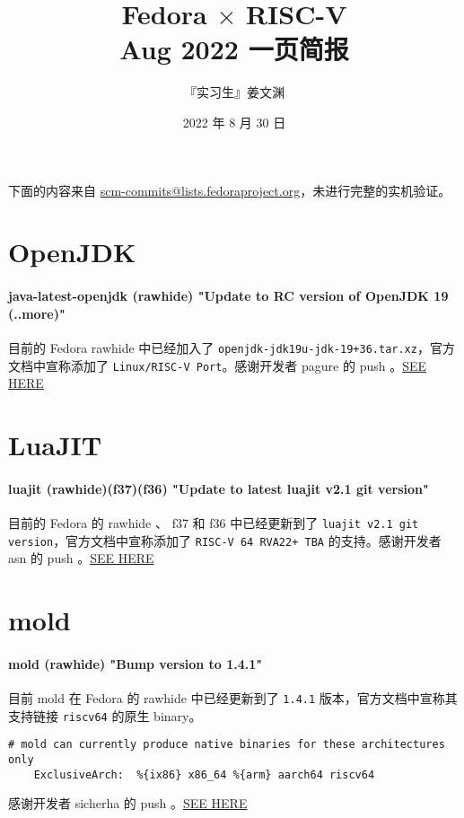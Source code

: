 \documentclass[cn,black,12pt,normal]{elegantnote}
\title{Fedora $\times$ RISC-V \\Aug 2022 一页简报}
\author{『实习生』姜文渊}
\institute{BJ-67 Tarsier-PLCT}
\date{2022 年 8 月 30 日}
\newcommand{\setParDef}{\setlength {\parskip} {0pt} }
\begin{document}
\maketitle

下面的内容来自 \url{scm-commits@lists.fedoraproject.org}，未进行完整的实机验证。

\section*{OpenJDK}

\paragraph*{java-latest-openjdk (rawhide) "Update to RC version of OpenJDK 19 (..more)"} 目前的 Fedora rawhide 中已经加入了 \lstinline{openjdk-jdk19u-jdk-19+36.tar.xz}，官方文档中宣称添加了 \lstinline{Linux/RISC-V Port}。感谢开发者 pagure 的 push 。\href{https://lists.fedoraproject.org/archives/list/scm-commits@lists.fedoraproject.org/message/UJ2DXOCMFG6H6WKK3MCKQYH66PCLMOKJ/}{SEE HERE}

\section*{LuaJIT}

\paragraph*{luajit (rawhide)(f37)(f36) "Update to latest luajit v2.1 git version"} 目前的 Fedora 的 rawhide 、 f37 和 f36 中已经更新到了 \lstinline{luajit v2.1 git version}，官方文档中宣称添加了 \lstinline{RISC-V 64 RVA22+ TBA} 的支持。感谢开发者 asn 的 push 。\href{https://lists.fedoraproject.org/archives/list/scm-commits@lists.fedoraproject.org/message/T4ABSC6XFUC2CXRGISJPM7GI7NQIMSVK/}{SEE HERE}

\section*{mold}

\paragraph*{mold (rawhide) "Bump version to 1.4.1"} 目前 mold 在 Fedora 的 rawhide 中已经更新到了 \lstinline{1.4.1} 版本，官方文档中宣称其支持链接 \lstinline{riscv64} 的原生 binary。
\begin{lstlisting}[commentstyle=\color{black}]
    # mold can currently produce native binaries for these architectures only
    ExclusiveArch:	%{ix86} x86_64 %{arm} aarch64 riscv64
\end{lstlisting}
感谢开发者 sicherha 的 push 。\href{https://lists.fedoraproject.org/archives/list/scm-commits@lists.fedoraproject.org/message/WDUJUOX3XOMIVAZRMYVEGTJQADEYL6RT/}{SEE HERE}
\end{document}

